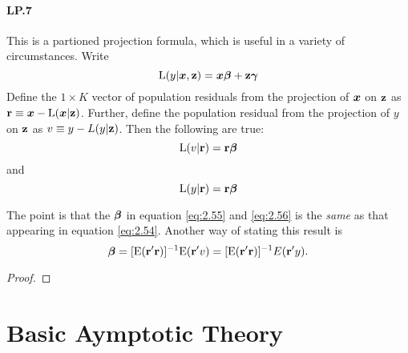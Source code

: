 \documentclass[11pt, oneside, a4paper, article]{article}
\numberwithin{equation}{section}
\begin{document}
\paragraph{LP.7}
This is a partioned projection formula, which is useful in a variety of circumstances.
Write
\begin{equation}	\label{eq:2.54}
	\text{L}(y | \boldsymbol{x}, \mathbf{z}) = \boldsymbol{x} \boldsymbol{\beta} + \mathbf{z} \boldsymbol{\gamma}
\end{equation}
Define the $1 \times K$ vector of population residuals from the
projection of $\boldsymbol{x}$ on $\mathbf{z}$ as $\mathbf{r} \equiv \boldsymbol{x} - \text{L} (\boldsymbol{x} | \mathbf{z})$.
Further, define the population residual from the 
projection of $y$ on $\mathbf{z}$ as $v \equiv y - L(y | \mathbf{z})$.
Then the following are true:
\begin{equation}\label{eq:2.55}
	\text{L}(v | \mathbf{r} ) = \mathbf{r} \boldsymbol{\beta}
\end{equation}
and
\begin{equation}\label{eq:2.56}
	\text{L}(y | \mathbf{r} ) = \mathbf{r} \boldsymbol{\beta}
\end{equation}

\begin{remark}
	The point is that the $\boldsymbol{\beta}$ in equation \eqref{eq:2.55} and \eqref{eq:2.56} is the \textit{same} as that appearing in equation \eqref{eq:2.54}.
	Another way of stating this result is
	\begin{equation}
		\label{eq:2.57}
		\boldsymbol{\beta}=
		[\text{E}(\mathbf{r}'\mathbf{r})]^{-1} \text{E}(\mathbf{r}'v) = [\text{E}(\mathbf{r}'\mathbf{r})]^{-1} E(\mathbf{r}'y).
	\end{equation}
\end{remark}

\begin{proof}
\end{proof}

\clearpage
\section{Basic Aymptotic Theory}

\noindent
\citet[C.3, p.35--45]{wool-2010}
\end{document}
